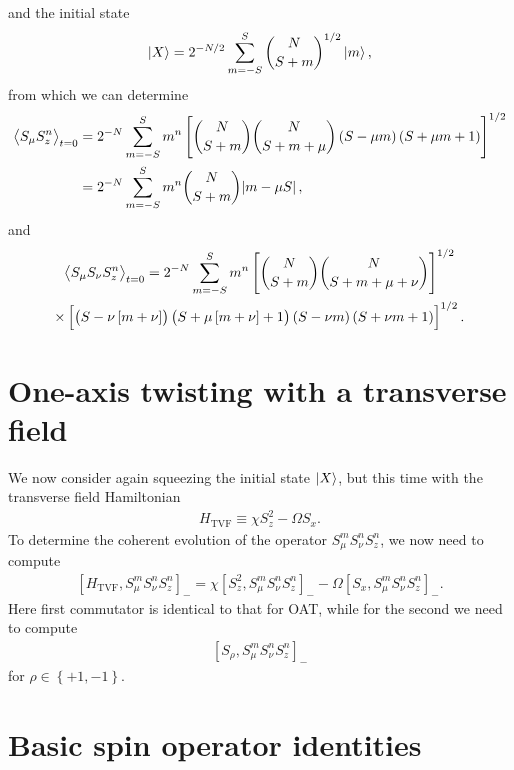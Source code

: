 \documentclass[aps,notitlepage,nofootinbib,11pt]{revtex4-1}
\renewcommand{\t}{\text} %
\newcommand{\p}[1]{\left(#1\right)} %
\renewcommand{\sp}[1]{\left[#1\right]} %
\renewcommand{\set}[1]{\left\{#1\right\}} %
\newcommand{\bk}{\Braket} %
\newcommand{\1}{\mathds{1}}
\begin{document}
and the initial state
\begin{align}
  \ket{X} = 2^{-N/2} \sum_{m=-S}^S { N \choose S+m }^{1/2} \ket{m},
\end{align}
from which we can determine
\begin{align}
  \bk{S_\mu S_z^n}_{t=0}
  &= 2^{-N} \sum_{m=-S}^S m^n
  \sp{{ N \choose S+m } { N \choose S+m+\mu }
    \p{S-\mu m}\p{S+\mu m+1}}^{1/2} \\
  &= 2^{-N} \sum_{m=-S}^S m^n { N \choose S+m } \abs{m - \mu S},
\end{align}
and
\begin{multline}
  \bk{S_\mu S_\nu S_z^n}_{t=0}
  = 2^{-N} \sum_{m=-S}^S m^n
  \sp{{ N \choose S+m } { N \choose S+m+\mu+\nu }}^{1/2} \\
  \times \sp{\p{S-\nu\sp{m+\nu}}\p{S+\mu\sp{m+\nu}+1}
    \p{S-\nu m}\p{S+\nu m+1}}^{1/2}.
\end{multline}


\section{One-axis twisting with a transverse field}

We now consider again squeezing the initial state $\ket{X}$, but this
time with the transverse field Hamiltonian
\begin{align}
  H_{\t{TVF}}
  \equiv \chi S_z^2- \Omega S_x.
\end{align}
To determine the coherent evolution of the operator
$S_\mu^m S_\nu^n S_z^n$, we now need to compute
\begin{align}
  \sp{H_{\t{TVF}}, S_\mu^m S_\nu^n S_z^n}_-
  = \chi \sp{S_z^2, S_\mu^m S_\nu^n S_z^n}_-
  - \Omega \sp{S_x, S_\mu^m S_\nu^n S_z^n}_-.
\end{align}
Here first commutator is identical to that for OAT, while for the
second we need to compute
\begin{align}
  \sp{S_\rho, S_\mu^m S_\nu^n S_z^n}_-
\end{align}
for $\rho\in\set{+1,-1}$.




\newpage
\appendix

\section{Basic spin operator identities}
\label{sec:identities}
\end{document}
